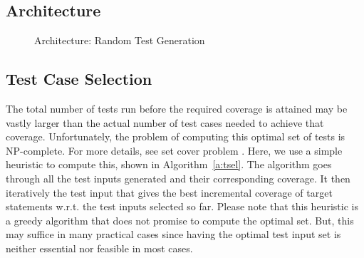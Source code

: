 \documentclass[12pts]{report}
\begin{document}
\subsection{Architecture}
\begin{figure}
\begin{center}
\end{center}
\caption{Architecture: Random Test Generation}
\label{f:rand-tg-arch}
\end{figure}

\subsection{Test Case Selection} \label{s:tsel}
The total number of tests run before the required coverage is attained may be vastly larger than the actual number of test cases needed to achieve that coverage. Unfortunately, the problem of computing this optimal set of tests is NP-complete. For more details, see set cover problem \cite{Karp1972}. Here, we use a simple heuristic to compute this, shown in Algorithm~\ref{a:tsel}. The algorithm goes through all the test inputs generated and their corresponding coverage. It then iteratively the test input that gives the best incremental coverage of target statements w.r.t. the test inputs selected so far. Please note that this heuristic is a greedy algorithm that does not promise to compute the optimal set. But, this may suffice in many practical cases since having the optimal test input set is neither essential nor feasible in most cases.
\end{document}
